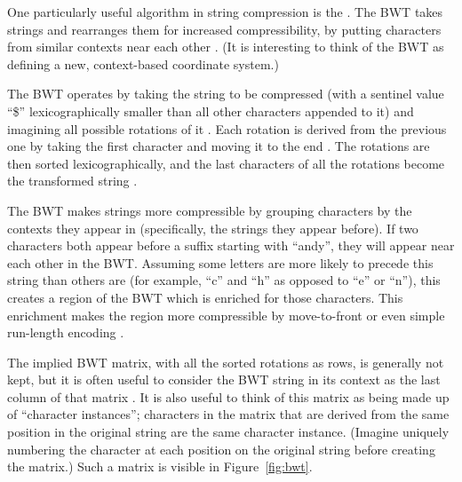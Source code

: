 \documentclass[11pt,proposal]{ucthesis}
\begin{document}
One particularly useful algorithm in string compression is the . The BWT takes strings and rearranges them for increased compressibility, by putting characters from similar contexts near each other \cite{burrows1994block}. (It is interesting to think of the BWT as defining a new, context-based coordinate system.)

The BWT operates by taking the string to be compressed (with a sentinel value ``\$'' lexicographically smaller than all other characters appended to it) and imagining all possible rotations of it \cite{burrows1994block, ferragina2000opportunistic}. Each rotation is derived from the previous one by taking the first character and moving it to the end \cite{burrows1994block}. The rotations are then sorted lexicographically, and the last characters of all the rotations become the transformed string \cite{burrows1994block}.

The BWT makes strings more compressible by grouping characters by the contexts they appear in (specifically, the strings they appear before). If two characters both appear before a suffix starting with ``andy'', they will appear near each other in the BWT. Assuming some letters are more likely to precede this string than others are (for example, ``c'' and ``h'' as opposed to ``e'' or ``n''), this creates a region of the BWT which is enriched for those characters. This enrichment makes the region more compressible by move-to-front or even simple run-length encoding \cite{burrows1994block}.

The implied BWT matrix, with all the sorted rotations as rows, is generally not kept, but it is often useful to consider the BWT string in its context as the last column of that matrix \cite{burrows1994block, ferragina2000opportunistic}. It is also useful to think of this matrix as being made up of ``character instances''; characters in the matrix that are derived from the same position in the original string are the same character instance. (Imagine uniquely numbering the character at each position on the original string before creating the matrix.) Such a matrix is visible in Figure~\ref{fig:bwt}.
\end{document}
